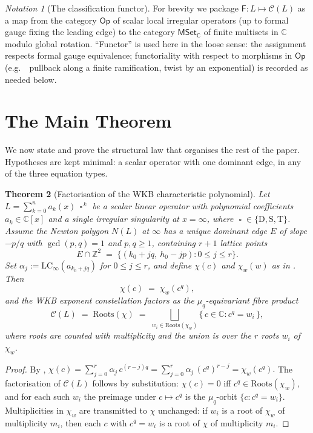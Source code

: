 \documentclass[11pt,a4paper]{article}
\theoremstyle{plain}
\newtheorem{theorem}{Theorem}[section]
\theoremstyle{definition}
\theoremstyle{remark}
\newtheorem{notation}[theorem]{Notation}
\newcommand{\op}{\mathop{\square}}                %
\newcommand{\opD}{\mathrm{D}}                     %
\newcommand{\opS}{\mathrm{S}}                     %
\newcommand{\opT}{\mathrm{T}}                     %
\newcommand{\LCinf}{\mathrm{LC}_\infty}
\newcommand{\Roots}{\mathrm{Roots}}
\newcommand{\NL}{N(L)}
\newcommand{\Cl}{\mathcal{C}}
\newcommand{\Fclass}{\mathsf{F}}
\newcommand{\eg}{e.g.\ }
\begin{document}
\begin{notation}[The classification functor]\label{not:F}
For brevity we package $\Fclass \colon L \mapsto \Cl(L)$ as a map from the
category $\mathsf{Op}$ of scalar local irregular operators (up to formal
gauge fixing the leading edge) to the category $\mathsf{MSet}_\mathbb{C}$
of finite multisets in $\mathbb{C}$ modulo global rotation. ``Functor'' is
used here in the loose sense: the assignment respects formal gauge
equivalence; functoriality with respect to morphisms in $\mathsf{Op}$
(\eg\ pullback along a finite ramification, twist by an exponential)
is recorded as needed below.
\end{notation}

\section{The Main Theorem}\label{sec:main}

We now state and prove the structural law that organises the rest of the
paper. Hypotheses are kept minimal: a scalar operator with one dominant
edge, in any of the three equation types.

\begin{theorem}[Factorisation of the WKB characteristic polynomial]\label{thm:main}
Let $L = \sum_{k=0}^{n} a_k(x)\, \op^{\,k}$ be a scalar linear operator with
polynomial coefficients $a_k \in \mathbb{C}[x]$ and a single irregular
singularity at $x = \infty$, where $\op \in \{\opD, \opS, \opT\}$. Assume
the Newton polygon $\NL$ at $\infty$ has a unique dominant edge $E$ of
slope $-p/q$ with $\gcd(p, q) = 1$ and $p, q \ge 1$, containing $r + 1$
lattice points
\[
   E \cap \mathbb{Z}^2 \;=\;
   \big\{(k_0 + jq,\ h_0 - jp) : 0 \le j \le r\big\}.
\]
Set $\alpha_j := \LCinf(a_{k_0 + jq})$ for $0 \le j \le r$, and define
$\chi(c)$ and $\chi_w(w)$ as in . Then
\[
   \boxed{\,
     \chi(c) \;=\; \chi_w(c^q),
   \,}
\]
and the WKB exponent constellation factors as the $\mu_q$-equivariant
fibre product
\[
   \Cl(L) \;=\; \Roots(\chi)
   \;=\;
   \bigsqcup_{w_i \in \Roots(\chi_w)}
   \big\{\, c \in \mathbb{C} : c^q = w_i \,\big\},
\]
where roots are counted with multiplicity and the union is over the $r$
roots $w_i$ of $\chi_w$.
\end{theorem}

\begin{proof}
By ,
$\chi(c) = \sum_{j=0}^{r} \alpha_j\, c^{(r-j) q}
       = \sum_{j=0}^{r} \alpha_j\, (c^q)^{r-j}
       = \chi_w(c^q).$
The factorisation of $\Cl(L)$ follows by substitution: $\chi(c) = 0$ iff
$c^q \in \Roots(\chi_w)$, and for each such $w_i$ the preimage under
$c \mapsto c^q$ is the $\mu_q$-orbit $\{c : c^q = w_i\}$. Multiplicities
in $\chi_w$ are transmitted to $\chi$ unchanged: if $w_i$ is a root of
$\chi_w$ of multiplicity $m_i$, then each $c$ with $c^q = w_i$ is a root
of $\chi$ of multiplicity $m_i$.
\end{proof}
\end{document}
